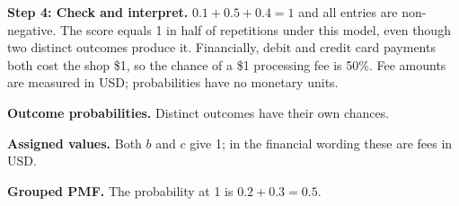 \par\medskip
\par\noindent\begin{minipage}{\linewidth}
\textbf{Step 4: Check and interpret.} $0.1+0.5+0.4=1$ and all entries are non-negative. The score equals 1 in half of repetitions under this model, even though two distinct outcomes produce it. Financially, debit and credit card payments both cost the shop \$1, so the chance of a \$1 processing fee is 50\%. Fee amounts are measured in USD; probabilities have no monetary units.
\end{minipage}\par\medskip
\par\noindent \begin{minipage}[t]{.32\linewidth}
\centering
{}
\par\small \textbf{Outcome probabilities.} Distinct outcomes have their own chances.
\end{minipage}\hfill\begin{minipage}[t]{.32\linewidth}
\centering
{}
\par\small \textbf{Assigned values.} Both $b$ and $c$ give 1; in the financial wording these are fees in USD.
\end{minipage}\hfill\begin{minipage}[t]{.32\linewidth}
\centering
{}
\par\small \textbf{Grouped PMF.} The probability at 1 is $0.2+0.3=0.5$.
\end{minipage}\par\medskip


